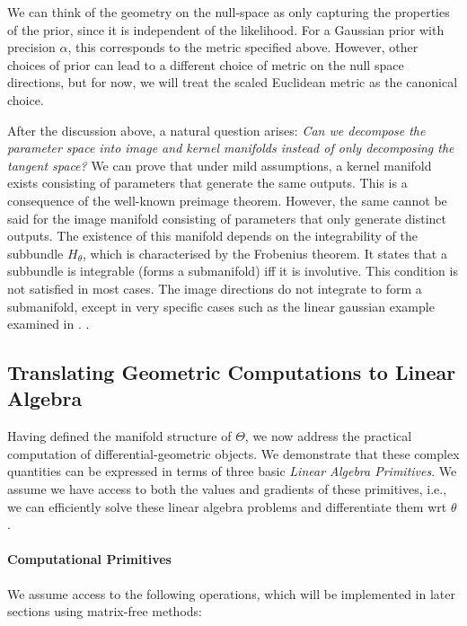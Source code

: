  We can think of the geometry on the null-space as only capturing the properties of the prior, since it is independent of the likelihood. For a Gaussian prior with precision $\alpha$, this corresponds to the metric specified above. However, other choices of prior can lead to a different choice of metric on the null space directions, but for now, we will treat the scaled Euclidean metric as the canonical choice. 
 
After the discussion above, a natural question arises: \emph{Can we decompose the parameter space into image and kernel manifolds instead of only decomposing the tangent space?} We can prove that under mild assumptions, a kernel manifold exists consisting of parameters that generate the same outputs. This is a consequence of the well-known preimage theorem. However, the same cannot be said for the image manifold consisting of parameters that only generate distinct outputs. The existence of this manifold depends on the integrability of the subbundle $H_\theta$, which is characterised by the Frobenius theorem. It states that a subbundle is integrable (forms a submanifold) iff it is involutive. This condition is not satisfied in most cases. The image directions do not integrate to form a submanifold, except in very specific cases such as the linear gaussian example examined in .
. 

\subsection{Translating Geometric Computations to Linear Algebra}
\label{subsec:geom_to_la}

Having defined the manifold structure of $\Theta$, we now address the practical computation of differential-geometric objects. We demonstrate that these complex quantities can be expressed in terms of three basic \emph{Linear Algebra Primitives}. We assume we have access to both the values and gradients of these primitives, i.e., we can efficiently solve these linear algebra problems and differentiate them wrt $\theta$.

\paragraph{Computational Primitives}
We assume access to the following operations, which will be implemented in later sections using matrix-free methods:


